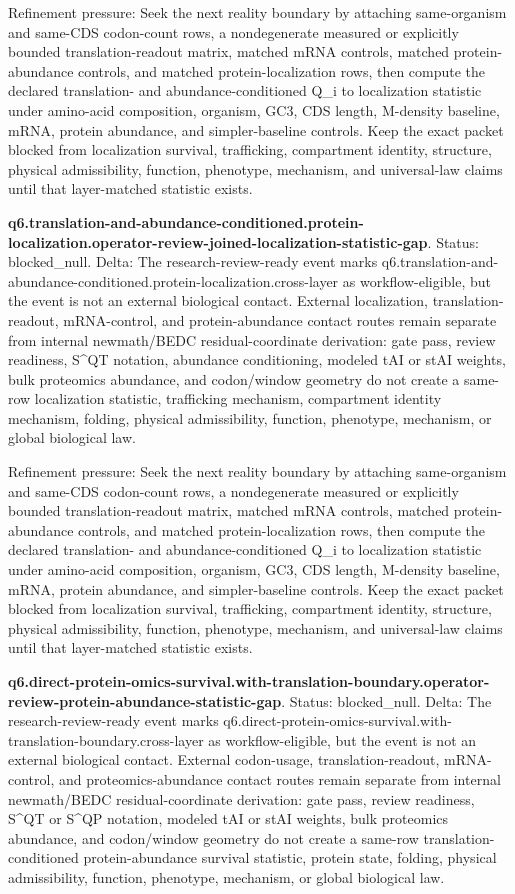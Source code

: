 Refinement pressure: Seek the next reality boundary by attaching same-organism and same-CDS codon-count rows, a nondegenerate measured or explicitly bounded translation-readout matrix, matched mRNA controls, matched protein-abundance controls, and matched protein-localization rows, then compute the declared translation- and abundance-conditioned Q\_i to localization statistic under amino-acid composition, organism, GC3, CDS length, M-density baseline, mRNA, protein abundance, and simpler-baseline controls. Keep the exact packet blocked from localization survival, trafficking, compartment identity, structure, physical admissibility, function, phenotype, mechanism, and universal-law claims until that layer-matched statistic exists.

\textbf{q6.translation-and-abundance-conditioned.protein-localization.operator-review-joined-localization-statistic-gap}. Status: blocked\_null. Delta: The research-review-ready event marks q6.translation-and-abundance-conditioned.protein-localization.cross-layer as workflow-eligible, but the event is not an external biological contact. External localization, translation-readout, mRNA-control, and protein-abundance contact routes remain separate from internal newmath/BEDC residual-coordinate derivation: gate pass, review readiness, S\textasciicircum{}QT notation, abundance conditioning, modeled tAI or stAI weights, bulk proteomics abundance, and codon/window geometry do not create a same-row localization statistic, trafficking mechanism, compartment identity mechanism, folding, physical admissibility, function, phenotype, mechanism, or global biological law.

Refinement pressure: Seek the next reality boundary by attaching same-organism and same-CDS codon-count rows, a nondegenerate measured or explicitly bounded translation-readout matrix, matched mRNA controls, matched protein-abundance controls, and matched protein-localization rows, then compute the declared translation- and abundance-conditioned Q\_i to localization statistic under amino-acid composition, organism, GC3, CDS length, M-density baseline, mRNA, protein abundance, and simpler-baseline controls. Keep the exact packet blocked from localization survival, trafficking, compartment identity, structure, physical admissibility, function, phenotype, mechanism, and universal-law claims until that layer-matched statistic exists.

\textbf{q6.direct-protein-omics-survival.with-translation-boundary.operator-review-protein-abundance-statistic-gap}. Status: blocked\_null. Delta: The research-review-ready event marks q6.direct-protein-omics-survival.with-translation-boundary.cross-layer as workflow-eligible, but the event is not an external biological contact. External codon-usage, translation-readout, mRNA-control, and proteomics-abundance contact routes remain separate from internal newmath/BEDC residual-coordinate derivation: gate pass, review readiness, S\textasciicircum{}QT or S\textasciicircum{}QP notation, modeled tAI or stAI weights, bulk proteomics abundance, and codon/window geometry do not create a same-row translation-conditioned protein-abundance survival statistic, protein state, folding, physical admissibility, function, phenotype, mechanism, or global biological law.

